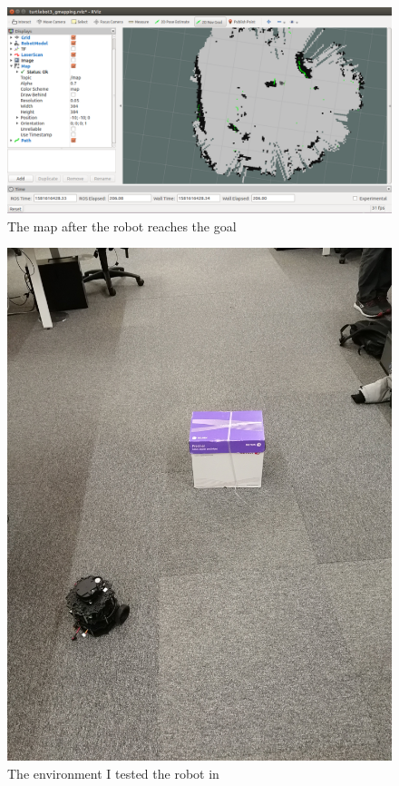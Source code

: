 \documentclass[12pt,a4paper]{article}
\begin{document}
\begin{enumerate}[label=(\alph*)]
	\begin{figure}[!htb]
		\centering
		\includegraphics[width=\textwidth]{fig/4e-after.png}
		\caption{The map after the robot reaches the goal}
		\label{fig:after}
	\end{figure}
	\begin{figure}[!htb]
		\centering
		\includegraphics[width=\textwidth]{fig/4e-env.jpg}
		\caption{The environment I tested the robot in}
		\label{fig:environ}
	\end{figure}

\end{enumerate}
\end{document}
